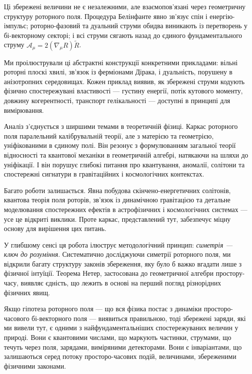 \documentclass[11pt,a4paper]{article}
\numberwithin{equation}{section}
\theoremstyle{plain}
\theoremstyle{definition}
\theoremstyle{remark}
\begin{document}
Ці збережені величини не є незалежними, але взаємопов'язані через геометричну структуру роторного поля. Процедура Белінфанте явно зв'язує спін і енергію-імпульс; роторно-фазовий та дуальний струми обидва виникають із перетворень у бі-векторному секторі; і всі струми сягають назад до єдиного фундаментального струму $\mathcal{A}_\mu = 2(\nabla_\mu R)\widetilde{R}$.

Ми проілюстрували ці абстрактні конструкції конкретними прикладами: вільні роторні плоскі хвилі, зв'язок із ферміонами Дірака, і дуальність, порушену в анізотропних середовищах. Кожен приклад виявив, як збережені струми кодують фізично спостережувані властивості — густину енергії, потік кутового моменту, довжину когерентності, транспорт гелікальності — доступні в принципі для вимірювання.

Аналіз з'єднується з ширшими темами в теоретичній фізиці. Каркас роторного поля паралельний калібрувальній теорії, але з матерією та геометрією, уніфікованими в єдиному полі. Він резонує з формулюванням загальної теорії відносності та квантової механіки в геометричній алгебрі, натякаючи на шляхи до уніфікації. І він порушує глибокі питання про квантування, аномалії, солітони та спостережні сигнатури в гравітаційних і космологічних контекстах.

Багато роботи залишається. Явна побудова скінчено-енергетичних солітонів, квантова теорія поля роторів, зв'язок із динамічною гравітацією та детальне моделювання спостережних ефектів в астрофізичних і космологічних системах — усе це відкриті виклики. Проте каркас, представлений тут, забезпечує міцну основу для вирішення цих питань.

У глибшому сенсі ця робота ілюструє методологічний принцип: \emph{симетрія — ключ до розуміння}. Систематично досліджуючи симетрії роторного поля, ми відкрили багату структуру законів збереження, яку було б важко вгадати лише з фізичної інтуїції. Теорема Нетер, застосована до геометричної алгебри простору-часу, виявляє єдність, що лежить в основі на перший погляд різнорідних фізичних явищ.

Якщо гіпотеза роторного поля — що вся фізика постає з динаміки просторо-часового бі-векторного поля — виявиться правильною, тоді збережені заряди, які ми вивели тут, є одними з найфундаментальніших спостережуваних величин у природі. Вони є квантовими числами, що маркують частинки, струмами, що течуть через поля, зарядами, виміряними детекторами. Вони є інваріантами, що залишаються серед потоку просторо-часових подій, величинами, збереженими фізичними законами.
\end{document}
